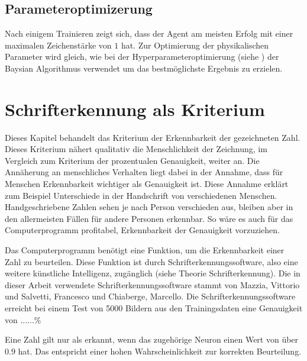 
\subsection*{Parameteroptimizerung}
Nach einigem Trainieren zeigt sich, dass der Agent am meisten Erfolg mit einer
maximalen Zeichenstärke von $1$ hat. Zur Optimierung der physikalischen
Parameter wird gleich, wie bei der Hyperparameteroptimierung (siehe %
) der Baysian Algorithmus verwendet um
das bestmöglichste Ergebnis zu erzielen.



\section{Schrifterkennung als Kriterium}
Dieses Kapitel behandelt das Kriterium der Erkennbarkeit der gezeichneten Zahl.
Dieses Kriterium nähert qualitativ die Menschlichkeit der Zeichnung, im
Vergleich zum Kriterium der prozentualen Genauigkeit, weiter an. Die Annäherung
an menschliches Verhalten liegt dabei in der Annahme, dass für Menschen
Erkennbarkeit wichtiger als Genauigkeit ist. Diese Annahme erklärt zum Beispiel
Unterschiede in der Handschrift von verschiedenen Menschen. Handgeschriebene
Zahlen sehen je nach Person verschieden aus, bleiben aber in den allermeisten
Fällen für andere Personen erkennbar. So wäre es auch für das Computerprogramm
profitabel, Erkennbarkeit der Genauigkeit vorzuziehen.

Das Computerprogramm benötigt eine Funktion, um die Erkennbarkeit einer Zahl zu
beurteilen. Diese Funktion ist durch Schrifterkennungssoftware, also eine  %
weitere künstliche Intelligenz, zugänglich (siehe Theorie Schrifterkennung). Die  %
in dieser Arbeit verwendete Schrifterkennungssoftware stammt von Mazzia,
Vittorio und Salvetti, Francesco und Chiaberge, Marcello.
\cite{mazzia_salvetti_efficient-capsnet_2021} Die Schrifterkennungssoftware
erreicht bei einem Test von 5000 Bildern aus den Trainingsdaten eine Genauigkeit
von ......\%

Eine Zahl gilt nur als erkannt, wenn das zugehörige Neuron einen Wert von über $0.9$
hat. Das entspricht einer hohen Wahrscheinlichkeit zur korrekten Beurteilung. 

